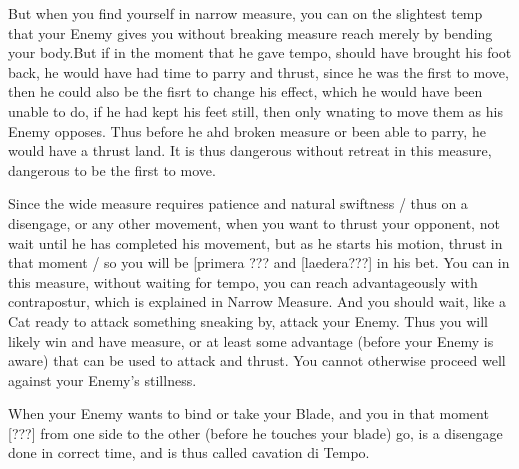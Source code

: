 But when you find yourself in narrow measure, you can on the slightest
temp that your Enemy gives you without breaking measure reach merely
by bending your body.But if in the moment that he gave tempo, should
have brought his foot back, he would have had time to parry and
thrust, since he was the first to move, then he could also be the
fisrt to change his effect, which he would have been unable to do, if
he had kept his feet still, then only wnating to move them as his
Enemy opposes. Thus before he ahd broken measure or been able to
parry, he would have a thrust land. It is thus dangerous without
retreat in this measure, dangerous to be the first to move.


Since the wide measure requires patience and natural swiftness / thus
on a disengage, or any other movement, when you want to thrust your
opponent, not wait until he has completed his movement, but as he
starts his motion, thrust in that moment / so you will be [primera ???
and [laedera???] in his bet. You can in this measure, without waiting
for tempo, you can reach advantageously with contrapostur, which is
explained in Narrow Measure. And you should wait, like a Cat ready to
attack something sneaking by, attack your Enemy. Thus you will likely
win and have measure, or at least some advantage (before your Enemy is
aware) that can be used to attack and thrust. You cannot otherwise
proceed well against your Enemy's stillness.



When your Enemy wants to bind or take your Blade, and you in that
moment [???] from one side to the other (before he touches your blade)
go, is a disengage done in correct time, and is thus called cavation di Tempo.